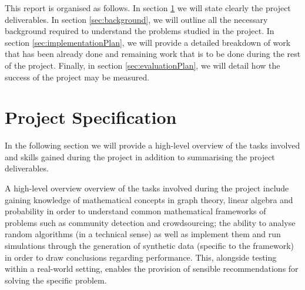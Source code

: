 \documentclass[12pt]{article}
\numberwithin{equation}{section}
\begin{document}
This report is organised as follows. In section \ref{sec:projectSpecification} we will state clearly the project deliverables. In section \ref{sec:background}, we will outline all the necessary background required to understand the problems studied in the project. In section \ref{sec:implementationPlan}, we will provide a detailed breakdown of work that has been already done and remaining work that is to be done during the rest of the project. Finally, in section \ref{sec:evaluationPlan}, we will detail how the success of the project may be measured.


\newpage
\thispagestyle{plain}
\mbox{}
\section {Project Specification}
\label{sec:projectSpecification}

In the following section we will provide a high-level overview of the tasks involved and skills gained during the project in addition to summarising the project deliverables.

A high-level overview overview of the tasks involved during the project include gaining knowledge of mathematical concepts in graph theory, linear algebra and probability in order to understand common mathematical frameworks of problems such as community detection and crowdsourcing; the ability to analyse random algorithms (in a technical sense) as well as implement them and run simulations through the generation of synthetic data (specific to the framework) in order to draw conclusions regarding performance. This, alongside testing within a real-world setting, enables the provision of sensible recommendations for solving the specific problem.
\end{document}
